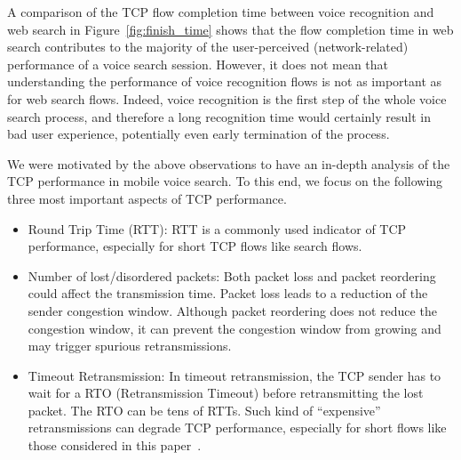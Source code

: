 A comparison of the TCP flow completion time between voice recognition and web search in Figure~\ref{fig:finish_time} shows that the flow completion time in web search contributes to the majority of the user-perceived (network-related) performance of a voice search session. However, it does not mean that understanding the performance of voice recognition flows is not as important as for web search flows. Indeed, voice recognition is the first step of the whole voice search process, and therefore a long recognition time would certainly result in bad user experience, potentially even early termination of the process.



We were motivated by the above observations to have an in-depth analysis of the TCP performance in mobile voice search. To this end, we focus on the following three most important aspects of TCP performance.

\begin{itemize}
	\item {Round Trip Time (RTT):} RTT is a commonly used indicator of TCP performance, especially for short TCP flows like search flows.
	
	\item {Number of lost/disordered packets:} Both packet loss and packet reordering could affect the transmission time. Packet loss leads to a reduction of the sender congestion window. Although packet reordering does not reduce the congestion window, it can prevent the congestion window from growing and may trigger spurious retransmissions.
	
	\item {Timeout Retransmission:} In timeout retransmission, the TCP sender has to wait for a RTO (Retransmission Timeout) before retransmitting the lost packet. The RTO can be tens of RTTs. Such kind of ``expensive'' retransmissions can degrade TCP performance, especially for short flows like those considered in this paper~\cite{flach2013reducing}.

\end{itemize}

